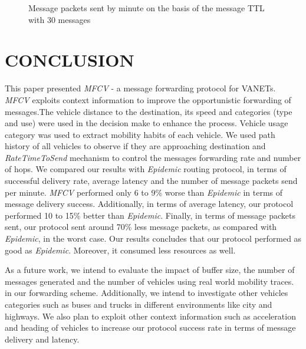 \documentclass[letterpaper, 10 pt, conference]{ieeeconf}  %
\begin{document}
\begin{figure}[thpb]
    \center
    \caption{Message packets sent by minute on the basis of the message TTL with 30 messages} \label{grafico4}
\end{figure}

\section{CONCLUSION}

This paper presented \emph{MFCV} - a message forwarding protocol for VANETs. \emph{MFCV} exploits context information to improve the opportunistic forwarding of messages.The vehicle distance to the destination, its speed and categories (type and use) were used in the decision make to enhance the process. Vehicle usage category was used to extract mobility habits of each vehicle. We used path history of all vehicles to observe if they are approaching destination and \emph{RateTimeToSend} mechanism to control the messages forwarding rate and number of hops. We compared our results with \emph{Epidemic} routing protocol, in terms of successful delivery rate, average latency and the number of message packets send per minute. \emph{MFCV} performed only 6 to 9\% worse than \emph{Epidemic} in terms of message delivery success. Additionally, in terms of average latency, our protocol performed 10 to 15\% better than \emph{Epidemic}. Finally, in terms of message packets sent, our protocol sent around 70\% less message packets, as compared with \emph{Epidemic}, in the worst case. Our results concludes that our protocol performed as good as \emph{Epidemic}. Moreover, it consumed less resources as well.

As a future work, we intend to evaluate the impact of buffer size, the number of messages generated and the number of vehicles using real world mobility traces. in our forwarding scheme. Additionally, we intend to investigate other vehicles categories such as buses and trucks in different environments like city and highways. We also plan to exploit other context information such as acceleration and heading of vehicles to increase our protocol success rate in terms of message delivery and latency.
\end{document}
